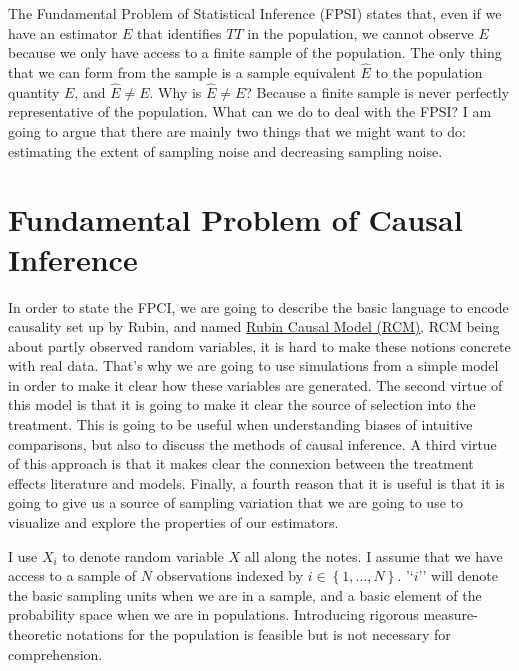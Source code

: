 \documentclass[
]{book}
\theoremstyle{definition}
\theoremstyle{definition}
\theoremstyle{definition}
\theoremstyle{definition}
\theoremstyle{remark}
\begin{document}
The Fundamental Problem of Statistical Inference (FPSI) states that, even if we have an estimator \(E\) that identifies \(TT\) in the population, we cannot observe \(E\) because we only have access to a finite sample of the population.
The only thing that we can form from the sample is a sample equivalent \(\hat{E}\) to the population quantity \(E\), and \(\hat{E}\neq E\).
Why is \(\hat{E}\neq E\)?
Because a finite sample is never perfectly representative of the population.
What can we do to deal with the FPSI?
I am going to argue that there are mainly two things that we might want to do: estimating the extent of sampling noise and decreasing sampling noise.

\hypertarget{FPCI}{%
\chapter{Fundamental Problem of Causal Inference}\label{FPCI}}

In order to state the FPCI, we are going to describe the basic language to encode causality set up by Rubin, and named \href{RCM.html}{Rubin Causal Model (RCM)}.
RCM being about partly observed random variables, it is hard to make these notions concrete with real data.
That's why we are going to use simulations from a simple model in order to make it clear how these variables are generated.
The second virtue of this model is that it is going to make it clear the source of selection into the treatment.
This is going to be useful when understanding biases of intuitive comparisons, but also to discuss the methods of causal inference.
A third virtue of this approach is that it makes clear the connexion between the treatment effects literature and models.
Finally, a fourth reason that it is useful is that it is going to give us a source of sampling variation that we are going to use to visualize and explore the properties of our estimators.

I use \(X_i\) to denote random variable \(X\) all along the notes.
I assume that we have access to a sample of \(N\) observations indexed by \(i\in\left\{1,\dots,N\right\}\).
'`\(i\)'' will denote the basic sampling units when we are in a sample, and a basic element of the probability space when we are in populations.
Introducing rigorous measure-theoretic notations for the population is feasible but is not necessary for comprehension.
\end{document}
